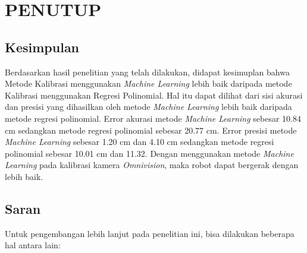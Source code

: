 \chapter{PENUTUP}
\label{chap:penutup}


\section{Kesimpulan}
\label{sec:kesimpulan}






Berdasarkan hasil penelitian yang telah dilakukan, didapat kesimuplan bahwa Metode Kalibrasi menggunakan \emph{Machine Learning} lebih baik daripada metode Kalibrasi menggunakan Regresi Polinomial. Hal itu dapat dilihat dari sisi akurasi dan presisi yang dihasilkan oleh metode \emph{Machine Learning} lebih baik daripada metode regresi polinomial. Error akurasi metode \emph{Machine Learning} sebesar 10.84 cm sedangkan metode regresi polinomial sebesar 20.77 cm. Error presisi metode \emph{Machine Learning} sebesar 1.20 cm dan 4.10 cm sedangkan metode regresi polinomial sebesar 10.01 cm dan 11.32. Dengan menggunakan metode \emph{Machine Learning} pada kalibrasi kamera \emph{Omnivision}, maka robot dapat bergerak dengan lebih baik. 

\section{Saran}
\label{chap:saran}


Untuk pengembangan lebih lanjut pada penelitian ini, bisa dilakukan beberapa hal antara lain:

